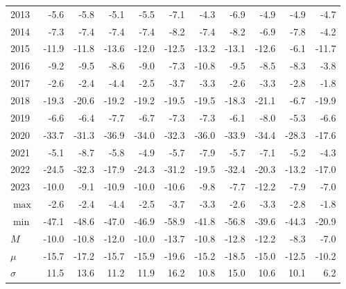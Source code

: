 \documentclass{article}
\begin{document}
\begin{table}[!ht]
\begin{tabular}{l | rrrr | rr | rr| rr}
2013 & -5.6 & -5.8 & -5.1 & -5.5 & \cellcolor{red!25}-7.1 & \cellcolor{green!25}-4.3 & -6.9 & -4.9 & -4.9 & -4.7 \\
2014 & -7.3 & -7.4 & -7.4 & -7.4 & \cellcolor{red!25}-8.2 & -7.4 & -8.2 & -6.9 & -7.8 & \cellcolor{green!25}-4.2 \\
2015 & -11.9 & -11.8 & \cellcolor{red!25}-13.6 & -12.0 & -12.5 & -13.2 & -13.1 & -12.6 & \cellcolor{green!25}-6.1 & -11.7 \\
2016 & -9.2 & -9.5 & -8.6 & -9.0 & -7.3 & \cellcolor{red!25}-10.8 & -9.5 & -8.5 & -8.3 & \cellcolor{green!25}-3.8 \\
2017 & -2.6 & -2.4 & \cellcolor{red!25}-4.4 & -2.5 & -3.7 & -3.3 & -2.6 & -3.3 & -2.8 & \cellcolor{green!25}-1.8 \\
2018 & -19.3 & -20.6 & -19.2 & -19.2 & -19.5 & -19.5 & -18.3 & \cellcolor{red!25}-21.1 & \cellcolor{green!25}-6.7 & -19.9 \\
2019 & -6.6 & -6.4 & -7.7 & -6.7 & -7.3 & -7.3 & -6.1 & \cellcolor{red!25}-8.0 & \cellcolor{green!25}-5.3 & -6.6 \\
2020 & -33.7 & -31.3 & \cellcolor{red!25}-36.9 & -34.0 & -32.3 & -36.0 & -33.9 & -34.4 & -28.3 & \cellcolor{green!25}-17.6 \\
2021 & -5.1 & \cellcolor{red!25}-8.7 & -5.8 & -4.9 & -5.7 & -7.9 & -5.7 & -7.1 & -5.2 & \cellcolor{green!25}-4.3 \\
2022 & -24.5 & -32.3 & -17.9 & -24.3 & -31.2 & -19.5 & \cellcolor{red!25}-32.4 & -20.3 & \cellcolor{green!25}-13.2 & -17.0 \\
2023 & -10.0 & -9.1 & -10.9 & -10.0 & -10.6 & -9.8 & -7.7 & \cellcolor{red!25}-12.2 & -7.9 & \cellcolor{green!25}-7.0 \\ \hline
$\max$ & -2.6 & -2.4 & \cellcolor{red!25}-4.4 & -2.5 & -3.7 & -3.3 & -2.6 & -3.3 & -2.8 & \cellcolor{green!25}-1.8 \\
$\min$ & -47.1 & -48.6 & -47.0 & -46.9 & \cellcolor{red!25}-58.9 & -41.8 & -56.8 & -39.6 & -44.3 & \cellcolor{green!25}-20.9 \\
$M$ & -10.0 & -10.8 & -12.0 & -10.0 & \cellcolor{red!25}-13.7 & -10.8 & -12.8 & -12.2 & -8.3 & \cellcolor{green!25}-7.0 \\
$\mu$  & -15.7 & -17.2 & -15.7 & -15.9 & \cellcolor{red!25}-19.6 & -15.2 & -18.5 & -15.0 & -12.5 & \cellcolor{green!25}-10.2 \\
$\sigma$ & 11.5 & 13.6 & 11.2 & 11.9 & \cellcolor{green!25}16.2 & 10.8 & 15.0 & 10.6 & 10.1 & \cellcolor{red!25}6.2 \\

\hline
    \end{tabular}
    \label{tab_comparison_drawdown}
\end{table}
\end{document}

